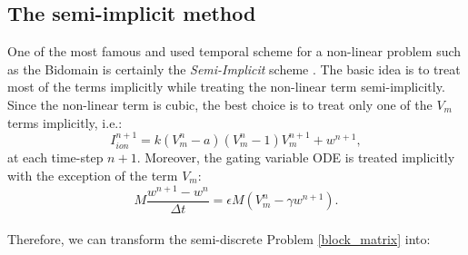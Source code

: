 \documentclass[a4paper,11pt]{article}
\begin{document}
\subsection{The semi-implicit method}\label{SI-method}
One of the most famous and used temporal scheme for a non-linear problem such as the Bidomain is certainly the \emph{Semi-Implicit} scheme \cite{acta}. The basic idea is to treat most of the terms implicitly while treating the non-linear term semi-implicitly. Since the non-linear term is cubic, the best choice is to treat only one of the $V_m$ terms implicitly, i.e.:
\begin{equation*}
I_{ion}^{n+1}=k(V_m^n-a)(V_m^n-1)V_m^{n+1}+w^{n+1},
\end{equation*}
at each time-step $n+1$. 
Moreover, the gating variable ODE is treated implicitly with the exception of the term $V_m$:
\begin{equation*}
M \frac{w^{n+1}-w^n}{\Delta t}=\epsilon M (V_m^n-\gamma w^{n+1}).
\end{equation*}
\vspace{5mm} \\
Therefore, we can transform the semi-discrete Problem \ref{block_matrix} into:
\end{document}
